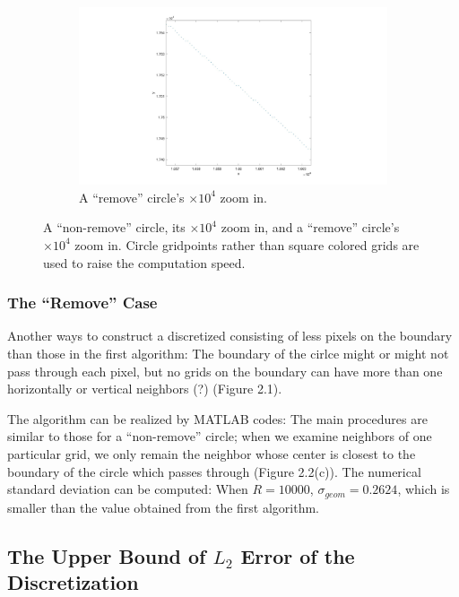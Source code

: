 \documentclass[letterpaper]{article}
\numberwithin{equation}{section} %
\numberwithin{figure}{section} %
\numberwithin{table}{section} %
\begin{document}
\begin{figure}[htbp]
	\begin{subfigure}[b]{0.6\textwidth}
		\includegraphics[width=\textwidth]{rmvCircleZI}
		\caption{A \enquote{remove} circle's $\times 10^4$ zoom in.}
		\label{rmvCircleZI}
	\end{subfigure}

	\caption{A \enquote{non-remove} circle, its $\times 10^4$ zoom in, and a \enquote{remove} circle's $\times 10^4$ zoom in. Circle gridpoints rather than square colored grids are used to raise the computation speed. }
	\label{circle and zoom in}
\end{figure}

	
\subsubsection{The \enquote{Remove} Case}

Another ways to construct a discretized consisting of less pixels on the boundary than those in the first algorithm: The boundary of the cirlce might or might not pass through each pixel, but no grids on the boundary can have more than one horizontally or vertical neighbors (?) (Figure 2.1).

The algorithm can be realized by MATLAB codes: The main procedures are similar to those for a \enquote{non-remove} circle; when we examine neighbors of one particular grid, we only remain the neighbor whose center is closest to the boundary of the circle which passes through (Figure 2.2(c)). The numerical standard deviation can be computed: When $R=10000$, $\sigma_{geom}=0.2624$, which is smaller than the value obtained from the first algorithm.

\subsection{The Upper Bound of $L_{2}$ Error of the Discretization}
\end{document}
